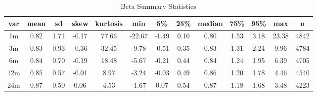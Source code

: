 \begin{table}

\caption{Beta Summary Statistics}
\centering
\begin{tabular}[t]{c|c|c|c|c|c|c|c|c|c|c|c|c}
\hline
var & mean & sd & skew & kurtosis & min & 5\% & 25\% & median & 75\% & 95\% & max & n\\
\hline
1m & 0.82 & 1.71 & -0.17 & 77.66 & -22.67 & -1.49 & 0.10 & 0.80 & 1.53 & 3.18 & 23.38 & 4842\\
\hline
3m & 0.83 & 0.93 & -0.36 & 32.45 & -9.78 & -0.51 & 0.35 & 0.83 & 1.31 & 2.24 & 9.96 & 4784\\
\hline
6m & 0.84 & 0.70 & -0.19 & 18.48 & -5.67 & -0.21 & 0.44 & 0.84 & 1.24 & 1.95 & 6.39 & 4705\\
\hline
12m & 0.85 & 0.57 & -0.01 & 8.97 & -3.24 & -0.03 & 0.49 & 0.86 & 1.20 & 1.78 & 4.46 & 4540\\
\hline
24m & 0.87 & 0.50 & 0.06 & 4.53 & -1.67 & 0.07 & 0.54 & 0.87 & 1.18 & 1.68 & 3.48 & 4223\\
\hline
\end{tabular}
\end{table}
